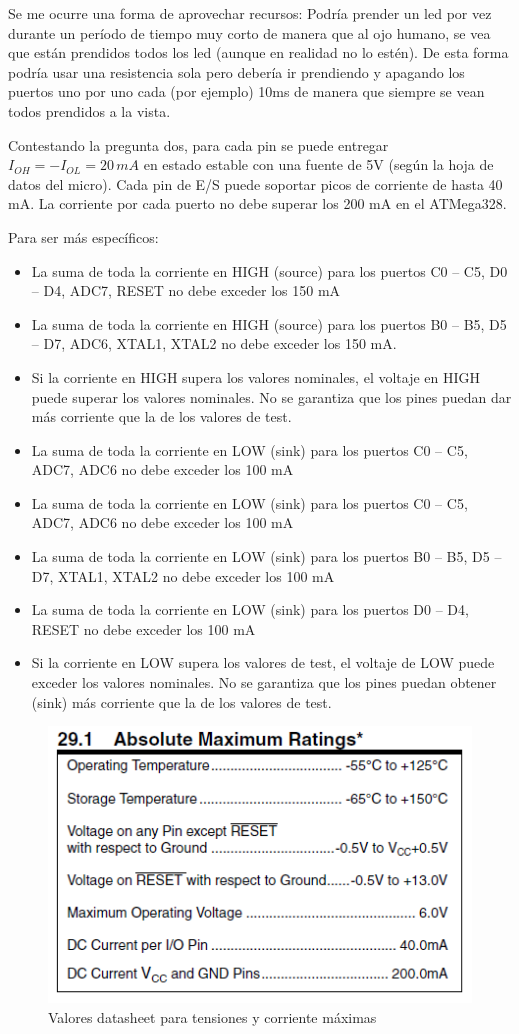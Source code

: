 Se me ocurre una forma de aprovechar recursos: Podría prender un led por vez durante un período de tiempo muy corto de manera que al ojo humano, se vea que están prendidos todos los led (aunque en realidad no lo estén). De esta forma podría usar una resistencia sola pero debería ir prendiendo y apagando los puertos uno por uno cada (por ejemplo) 10ms de manera que siempre se vean todos prendidos a la vista.

Contestando la pregunta dos, para cada pin se puede entregar $I_{OH}=-I_{OL}=20\,mA$ en estado estable con una fuente de 5V (según la hoja de datos del micro).
Cada pin de E/S puede soportar picos de corriente de hasta 40 mA.
La corriente por cada puerto no debe superar los 200 mA en el ATMega328.

Para ser más específicos:
\begin{itemize}
    \item La suma de toda la corriente en HIGH (source) para los puertos C0 – C5, D0 – D4, ADC7, RESET no debe exceder los 150 mA
    \item La suma de toda la corriente en HIGH (source) para los puertos B0 – B5, D5 – D7, ADC6, XTAL1, XTAL2 no debe exceder los 150 mA.
    \item Si la corriente en HIGH supera los valores nominales, el voltaje en HIGH puede superar los valores nominales. No se garantiza que los pines puedan dar más corriente que la de los valores de test.
    \item La suma de toda la corriente en LOW (sink) para los puertos C0 – C5, ADC7, ADC6 no debe exceder los 100 mA
    \item La suma de toda la corriente en LOW (sink) para los puertos C0 – C5, ADC7, ADC6 no debe exceder los 100 mA
    \item La suma de toda la corriente en LOW (sink) para los puertos B0 – B5, D5 – D7, XTAL1, XTAL2 no debe exceder los 100 mA
    \item La suma de toda la corriente en LOW (sink) para los puertos  D0 – D4, RESET no debe exceder los 100 mA
    \item Si la corriente en LOW supera los valores de test, el voltaje de LOW puede exceder los valores nominales. No se garantiza que los pines puedan obtener (sink) más corriente que la de los valores de test.
\end{itemize}


\begin{figure}[H]
    \centering
    \includegraphics[width=.6\linewidth]{imagenes/Atmega 328 absolute maximum ratings.PNG}
    \caption{Valores datasheet para tensiones y corriente máximas}
    \label{fig:diodos}
\end{figure}

